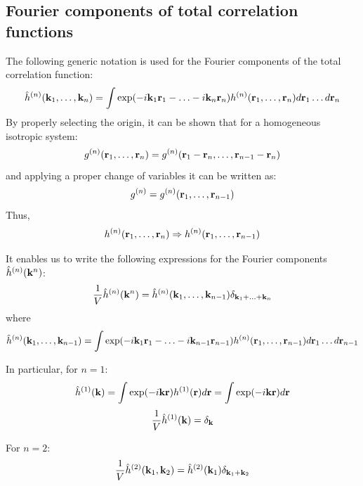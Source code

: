 \subsection{Fourier components of total correlation functions}
The following generic notation is used for the Fourier components of the total correlation function:
\begin{equation}
\hat{h}^{(n)}(\vb{k}_1,\dotsc, \vb{k}_n) = \int \exp(-i\vb{k}_1\vb{r}_1 - \dotsc - i\vb{k}_n\vb{r}_n) h^{(n)}(\vb{r}_1, \dotsc, \vb{r}_n) d\vb{r}_1\dotsc d\vb{r}_n
\end{equation}
By properly selecting the origin, it can be shown that for a homogeneous isotropic system:
\begin{equation}
g^{(n)}(\vb{r}_1, \dotsc, \vb{r}_n) = g^{(n)}(\vb{r}_1 - \vb{r}_n, \dotsc, \vb{r}_{n-1} - \vb{r}_{n})
\end{equation}
and applying a proper change of variables it can be written as:
\begin{equation}
g^{(n)} = g^{(n)}(\vb{r}_1, \dotsc, \vb{r}_{n-1})
\end{equation}
Thus,
\begin{equation}
h^{(n)}(\vb{r}_1, \dotsc, \vb{r}_n) \Rightarrow h^{(n)}(\vb{r}_1, \dotsc, \vb{r}_{n-1})
\end{equation}

It enables us to write the following expressions for the Fourier components $\hat{h}^{(n)} (\vb{k}^n)$:
\begin{equation}
\frac{1}{V}\hat{h}^{(n)} (\vb{k}^n) = \hat{h}^{(n)} (\vb{k}_1, \dotsc, \vb{k}_{n-1}) 
\delta_{\vb{k}_1+\dotsc + \vb{k}_n}
\end{equation}
where
\begin{equation}
\hat{h}^{(n)}(\vb{k}_1, \dotsc, \vb{k}_{n-1}) = \int \exp(-i\vb{k}_1\vb{r}_1 - \dotsc - i\vb{k}_{n-1}\vb{r}_{n-1}) h^{(n)}(\vb{r}_1, \dotsc, \vb{r}_{n-1})d\vb{r}_1\dotsc d\vb{r}_{n-1}
\end{equation}

In particular, for $n=1$:
\begin{equation}
\hat{h}^{(1)}(\vb{k}) = \int \exp(-i\vb{k}\vb{r})h^{(1)}(\vb{r})d\vb{r} = \int \exp(-i\vb{k}\vb{r})d\vb{r}
\end{equation}
\begin{equation}
\frac{1}{V}\hat{h}^{(1)}(\vb{k}) = \delta_{\vb{k}}
\end{equation}

For $n=2$:
\begin{equation}
\frac{1}{V}\hat{h}^{(2)}(\vb{k}_1, \vb{k}_2) = \hat{h}^{(2)}(\vb{k}_1)\delta_{\vb{k}_1 + \vb{k}_2}
\end{equation}

